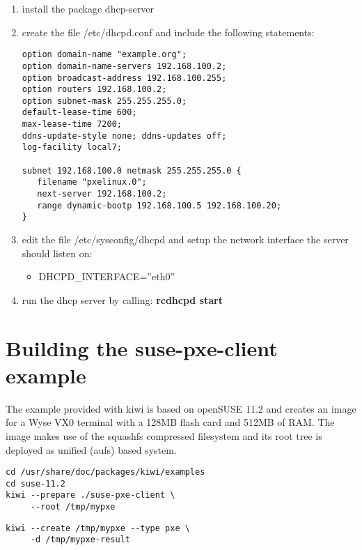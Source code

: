 \begin{enumerate}
\item install the package dhcp-server
\item create the file /etc/dhcpd.conf and include the following
      statements:
 
      \begin{verbatim}
option domain-name "example.org";
option domain-name-servers 192.168.100.2;
option broadcast-address 192.168.100.255;
option routers 192.168.100.2;
option subnet-mask 255.255.255.0;
default-lease-time 600;
max-lease-time 7200;
ddns-update-style none; ddns-updates off;
log-facility local7;

subnet 192.168.100.0 netmask 255.255.255.0 {
   filename "pxelinux.0";
   next-server 192.168.100.2;
   range dynamic-bootp 192.168.100.5 192.168.100.20;
}
\end{verbatim}

\item edit the file /etc/sysconfig/dhcpd and setup the network
      interface the server should listen on:
      \begin{itemize}
      \item DHCPD\_INTERFACE=''eth0''
      \end{itemize}
\item run the dhcp server by calling:
      \textbf{rcdhcpd start}
\end{enumerate}

\section{Building the suse-pxe-client example}

The example provided with kiwi is based on openSUSE 11.2 and creates an
image for a Wyse VX0 terminal with a 128MB flash card and 512MB of RAM.
The image makes use of the squashfs compressed filesystem and its
root tree is deployed as unified (aufs) based system. 

\begin{Command}{12cm}
\begin{verbatim}
cd /usr/share/doc/packages/kiwi/examples
cd suse-11.2
kiwi --prepare ./suse-pxe-client \
     --root /tmp/mypxe
\end{verbatim}
\end{Command}

\begin{Command}{12cm}
\begin{verbatim}
kiwi --create /tmp/mypxe --type pxe \
     -d /tmp/mypxe-result
\end{verbatim}
\end{Command}

